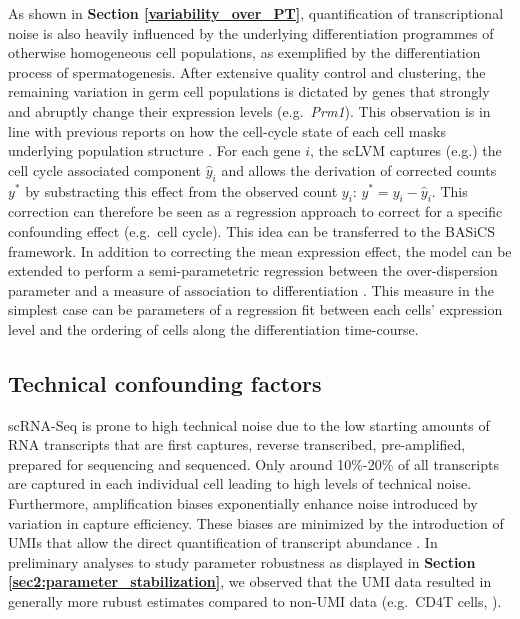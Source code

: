 \newpage
 
As shown in \textbf{Section \ref{variability_over_PT}}, quantification of transcriptional noise is also heavily influenced by the underlying differentiation programmes of otherwise homogeneous cell populations, as exemplified by the differentiation process of spermatogenesis. After extensive quality control and clustering, the remaining variation in germ cell populations is dictated by genes that strongly and abruptly change their expression levels (e.g.~\textit{Prm1}). This observation is in line with previous reports on how the cell-cycle state of each cell masks underlying population structure \citep{Buettner2015}. For each gene $i$, the \gls{scLVM} captures (e.g.) the cell cycle associated component $\hat{y}_i$ and allows the derivation of corrected counts $y^{\ast}$ by substracting this effect from the observed count $y_i$: $y^{\ast}=y_i-\hat{y}_i$. This correction can therefore be seen as a regression approach to correct for a specific confounding effect (e.g.~cell cycle). This idea can be transferred to the BASiCS framework. In addition to correcting the mean expression effect, the model can be extended to perform a semi-parametetric regression between the over-dispersion parameter and a measure of association to differentiation . This measure in the simplest case can be parameters of a regression fit between each cells' expression level and the ordering of cells along the differentiation time-course. \\

\subsection{Technical confounding factors}

\Gls{scRNA-Seq} is prone to high technical noise due to the low starting amounts of RNA transcripts that are first captures, reverse transcribed, pre-amplified, prepared for sequencing and sequenced. Only around 10\%-20\% of all transcripts are captured in each individual cell leading to high levels of technical noise. Furthermore, amplification biases exponentially enhance noise introduced by variation in capture efficiency. These biases are minimized by the introduction of \glspl{UMI} that allow the direct quantification of transcript abundance \cite{Islam2014}. In preliminary analyses to study parameter robustness as displayed in \textbf{Section \ref{sec2:parameter_stabilization}}, we observed that the UMI data \citep{Zeisel2015} resulted in generally more rubust estimates compared to non-UMI data (e.g.~CD4\plus T cells, \citep{Martinez-jimenez2017}).\\

